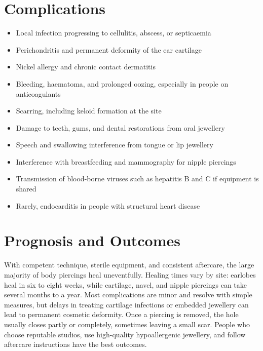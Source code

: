 \section*{Complications}
\begin{itemize}
    \item Local infection progressing to cellulitis, abscess, or septicaemia
    \item Perichondritis and permanent deformity of the ear cartilage
    \item Nickel allergy and chronic contact dermatitis
    \item Bleeding, haematoma, and prolonged oozing, especially in people on anticoagulants
    \item Scarring, including keloid formation at the site
    \item Damage to teeth, gums, and dental restorations from oral jewellery
    \item Speech and swallowing interference from tongue or lip jewellery
    \item Interference with breastfeeding and mammography for nipple piercings
    \item Transmission of blood-borne viruses such as hepatitis B and C if equipment is shared
    \item Rarely, endocarditis in people with structural heart disease
\end{itemize}

\section*{Prognosis and Outcomes}
With competent technique, sterile equipment, and consistent aftercare, the large majority of body piercings heal uneventfully. Healing times vary by site: earlobes heal in six to eight weeks, while cartilage, navel, and nipple piercings can take several months to a year. Most complications are minor and resolve with simple measures, but delays in treating cartilage infections or embedded jewellery can lead to permanent cosmetic deformity. Once a piercing is removed, the hole usually closes partly or completely, sometimes leaving a small scar. People who choose reputable studios, use high-quality hypoallergenic jewellery, and follow aftercare instructions have the best outcomes.

